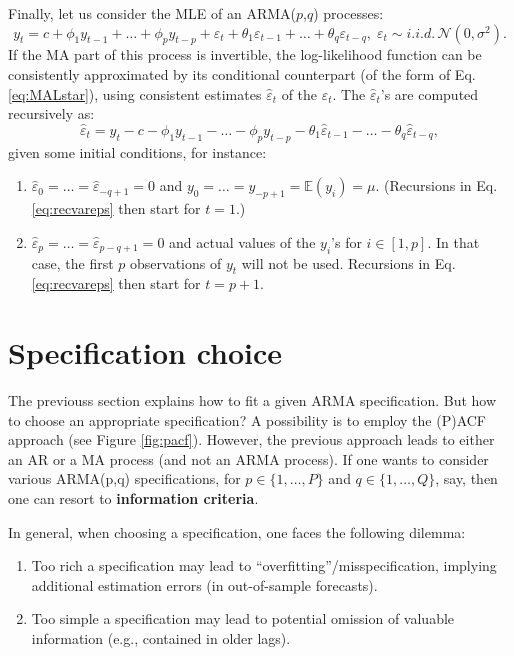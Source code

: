 \documentclass[
  12pt,
]{book}
\providecommand{\tightlist}{%
  \setlength{\itemsep}{0pt}\setlength{\parskip}{0pt}}
\theoremstyle{definition}
\theoremstyle{definition}
\theoremstyle{definition}
\theoremstyle{definition}
\theoremstyle{remark}
\begin{document}
Finally, let us consider the MLE of an ARMA(\(p\),\(q\)) processes:
\[
y_t = c + \phi_1 y_{t-1} + \dots + \phi_p y_{t-p} + \varepsilon_t + \theta_1 \varepsilon_{t-1} +
\dots + \theta_q \varepsilon_{t-q} , \; \varepsilon_t \sim i.i.d.\,\mathcal{N}(0,\sigma^2).
\]
If the MA part of this process is invertible, the log-likelihood function can be consistently approximated by its conditional counterpart (of the form of Eq. \eqref{eq:MALstar}), using consistent estimates \(\hat\varepsilon_t\) of the \(\varepsilon_t\). The \(\hat\varepsilon_t\)'s are computed recursively as:
\begin{equation}
\hat\varepsilon_t = y_t - c - \phi_1 y_{t-1} - \dots - \phi_p y_{t-p} - \theta_1 \hat\varepsilon_{t-1} - \dots - \theta_q \hat\varepsilon_{t-q},\label{eq:recvareps}
\end{equation}
given some initial conditions, for instance:

\begin{enumerate}
\def\labelenumi{\alph{enumi}.}
\tightlist
\item
  \(\hat\varepsilon_0=\dots=\hat\varepsilon_{-q+1}=0\) and \(y_{0}=\dots=y_{-p+1}=\mathbb{E}(y_i)=\mu\). (Recursions in Eq. \eqref{eq:recvareps} then start for \(t=1\).)
\item
  \(\hat\varepsilon_p=\dots=\hat\varepsilon_{p-q+1}=0\) and actual values of the \(y_{i}\)'s for \(i \in [1,p]\). In that case, the first \(p\) observations of \(y_t\) will not be used. Recursions in Eq. \eqref{eq:recvareps} then start for \(t=p+1\).
\end{enumerate}

\hypertarget{specification-choice}{%
\section{Specification choice}\label{specification-choice}}

The previouss section explains how to fit a given ARMA specification. But how to choose an appropriate specification? A possibility is to employ the (P)ACF approach (see Figure \ref{fig:pacf}). However, the previous approach leads to either an AR or a MA process (and not an ARMA process). If one wants to consider various ARMA(p,q) specifications, for \(p \in \{1,\dots,P\}\) and \(q \in \{1,\dots,Q\}\), say, then one can resort to \textbf{information criteria}.

In general, when choosing a specification, one faces the following dilemma:

\begin{enumerate}
\def\labelenumi{\alph{enumi}.}
\tightlist
\item
  Too rich a specification may lead to ``overfitting''/misspecification, implying additional estimation errors (in out-of-sample forecasts).
\item
  Too simple a specification may lead to potential omission of valuable information (e.g., contained in older lags).
\end{enumerate}
\end{document}
